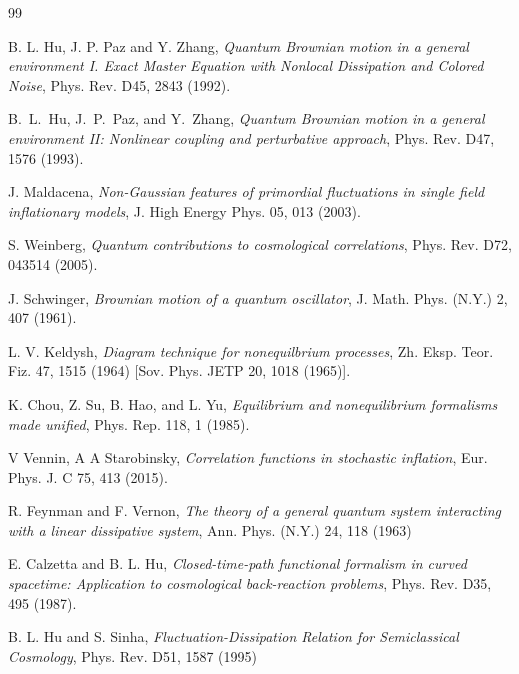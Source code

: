 \documentclass[%
amssymb,preprint,preprintnumbers,nofootinbib,superscriptaddress]{revtex4}
\begin{document}
%


\begin{thebibliography}{99}

 B. L. Hu, J. P. Paz and Y. Zhang, \textit{Quantum Brownian motion in a general environment I.  Exact Master Equation with Nonlocal Dissipation and Colored Noise}, Phys. Rev. D45, 2843 (1992).



B.~L.~Hu, J.~P.~Paz, and Y.~Zhang, \textit{Quantum Brownian motion in a general environment II: Nonlinear coupling and perturbative approach},
Phys. Rev. D47, 1576 (1993).



J. Maldacena, \textit{Non-Gaussian features of primordial fluctuations in single field inflationary models}, J. High Energy Phys. 05, 013 (2003).

S. Weinberg, \textit{Quantum contributions to cosmological correlations}, Phys. Rev. D72, 043514 (2005).




J. Schwinger, \textit{Brownian motion of a quantum oscillator}, J. Math. Phys. (N.Y.) 2, 407 (1961).

L. V. Keldysh, \textit{Diagram technique for nonequilbrium processes},
Zh. Eksp. Teor. Fiz. 47, 1515 (1964) [Sov. Phys. JETP
20, 1018 (1965)].

K. Chou, Z. Su, B. Hao, and L. Yu, \textit{Equilibrium and
nonequilibrium formalisms made unified}, Phys. Rep. 118, 1
(1985).


V Vennin, A A Starobinsky, \textit{Correlation functions in stochastic inflation}, Eur. Phys. J. C 75, 413 (2015).



R. Feynman and F. Vernon, \textit{The theory of a general quantum system interacting with a linear dissipative system}, Ann.
Phys. (N.Y.) 24, 118 (1963)

E. Calzetta and B. L. Hu, \textit{Closed-time-path functional formalism in curved spacetime: Application
to cosmological back-reaction problems}, Phys. Rev. D35, 495 (1987).

B. L. Hu and  S. Sinha,	\textit{Fluctuation-Dissipation Relation for Semiclassical Cosmology}, Phys. Rev. D51, 1587 (1995)


\end{thebibliography}
\end{document}
